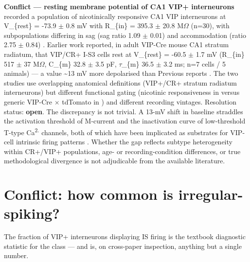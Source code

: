 \documentclass[11pt]{article}
\begin{document}
\begin{framed}
\textbf{Conflict --- resting membrane potential of CA1 VIP+ interneurons}\\
\citet{Bell2015} recorded a population of nicotinically responsive CA1 VIP interneurons at V\_\{rest\} = -73.9 $\pm$ 0.8 mV with R\_\{in\} = 395.3 $\pm$ 20.8 M$\Omega$ (n=30), with subpopulations differing in sag (sag ratio 1.09 $\pm$ 0.01) and accommodation (ratio 2.75 $\pm$ 0.84) \citep{Bell2015}. Earlier work reported, in adult VIP-Cre mouse CA1 stratum radiatum, that VIP/CR+ I-S3 cells rest at V\_\{rest\} = -60.5 $\pm$ 1.7 mV (R\_\{in\} 517 $\pm$ 37 M$\Omega$, C\_\{m\} 32.8 $\pm$ 3.5 pF, $\tau$\_\{m\} 36.5 $\pm$ 3.2 ms; n=7 cells / 5 animals) --- a value {\textasciitilde}13 mV more depolarised than Previous reports \citep{Bell2015} \citep{Michaud2024}. The two studies use overlapping anatomical definitions (VIP+/CR+ stratum radiatum interneurons) but different functional gating (nicotinic responsiveness in \citet{Bell2015} versus generic VIP-Cre $\times$ tdTomato in \citet{Michaud2024}) and different recording vintages. Resolution status: \textbf{open}. The discrepancy is not trivial. A 13-mV shift in baseline straddles the activation threshold of M-current and the inactivation curve of low-threshold T-type Ca\textsuperscript{2}\textsuperscript{.} channels, both of which have been implicated as substrates for VIP-cell intrinsic firing patterns \citep{Goff2019, Porter1998}. Whether the gap reflects subtype heterogeneity within CR+/VIP+ populations, age- or recording-condition differences, or true methodological divergence is not adjudicable from the available literature.
\end{framed}

\section{Conflict: how common is irregular-spiking?}\label{sec-05-conflict-isfraction}

The fraction of VIP+ interneurons displaying IS firing is the textbook diagnostic statistic for the class --- and is, on cross-paper inspection, anything but a single number.
\end{document}
